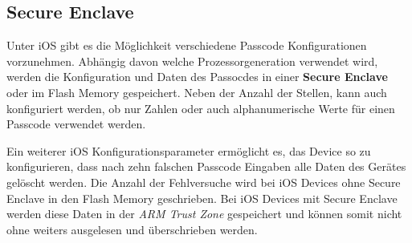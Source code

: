 \subsection{Secure Enclave}
\label{sec:Frage1SecureEnclave}
 
 Unter iOS gibt es die Möglichkeit verschiedene Passcode Konfigurationen vorzunehmen. Abhängig davon welche Prozessorgeneration verwendet wird, werden die Konfiguration und Daten des Passocdes in einer \textbf{Secure Enclave} oder im Flash Memory gespeichert. Neben der Anzahl der Stellen, kann auch konfiguriert werden, ob nur Zahlen oder auch alphanumerische Werte für einen Passcode verwendet werden.\par 
 Ein weiterer iOS Konfigurationsparameter ermöglicht es, das Device so zu konfigurieren, dass nach zehn falschen Passcode Eingaben alle Daten des Gerätes gelöscht werden. Die Anzahl der Fehlversuche wird bei iOS Devices ohne Secure Enclave in den Flash Memory geschrieben. Bei iOS Devices mit Secure Enclave werden diese Daten in der \textit{\glqq ARM Trust Zone\grqq{}} gespeichert und können somit nicht ohne weiters ausgelesen und überschrieben werden. 
 
 
